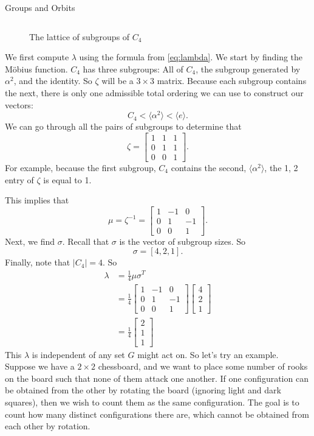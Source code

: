 \documentclass[12pt]{pom_thesis}
\begin{document}
\begin{chapter}{Groups and Orbits}
\begin{examp}
\begin{figure}[h]
\[\]
\caption{The lattice of subgroups of $C_4$}
\label{fig:c4_lattice}
\end{figure}We first compute $\lambda$ using the formula from \eqref{eq:lambda}. We start by finding the M\"obius function. $C_4$ has three subgroups: All of $C_4$, the subgroup generated by $\alpha^2$, and the identity. So $\zeta$ will be a $3 \times 3$ matrix. Because each subgroup contains the next, there is only one admissible total ordering we can use to construct our vectors:
\[
C_4 < \langle \alpha^2 \rangle < \langle e \rangle.
\]
We can go through all the pairs of subgroups to determine that
\[
\zeta = \begin{bmatrix} 1 & 1 & 1 \\ 0 & 1 & 1 \\ 0 & 0 & 1 \end{bmatrix}.
\]
For example, because the first subgroup, $C_4$ contains the second, $\langle \alpha^2 \rangle$, the 1, 2 entry of $\zeta$ is equal to 1.

This implies that
\[
\mu = \zeta^{-1} = \begin{bmatrix} 1 & -1 & 0\\ 0 & 1 & -1 \\ 0 & 0 & 1 \end{bmatrix}.
\]
Next, we find $\sigma$. Recall that $\sigma$ is the vector of subgroup sizes. So 
\[
\sigma = [4, 2, 1].
\]
Finally, note that $|C_4|=4$. So
\begin{align*}
\lambda &= \frac 14 \mu \sigma^T\\
&= \frac 14 
\begin{bmatrix} 1 & -1 & 0\\ 0 & 1 & -1 \\ 0 & 0 & 1 \end{bmatrix}
\begin{bmatrix} 4 \\ 2 \\ 1 \end{bmatrix}\\
&= \frac 14 \begin{bmatrix} 2 \\ 1 \\ 1\end{bmatrix}
\end{align*}
This $\lambda$ is independent of any set $G$ might act on. So let's try an example. Suppose we have a $2 \times 2$ chessboard, and we want to place some number of rooks on the board such that none of them attack one another. If one configuration can be obtained from the other by rotating the board (ignoring light and dark squares), then we wish to count them as the same configuration. The goal is to count how many distinct configurations there are, which cannot be obtained from each other by rotation.


\end{examp}
\end{chapter}
\end{document}
